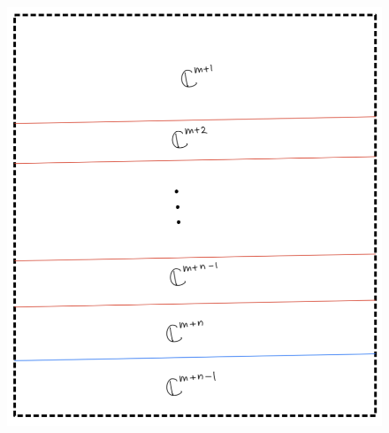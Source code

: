 \begin{enumerate}[label=(\roman*)]
\begin{enumerate}[label=(Step \arabic*)]
\begin{figure}[H]
    \centering
    \includegraphics[scale = 0.95]{diagrams/cobord7/7.png}
    \caption{}
    \label{fig:your-label}
\end{figure}
\end{enumerate}
\end{enumerate}
\pagebreak 